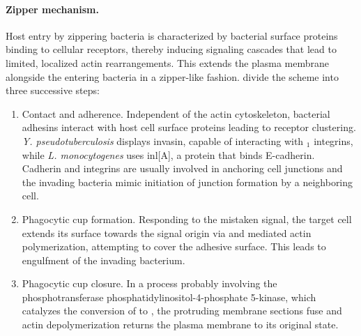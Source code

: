 \paragraph{Zipper mechanism.}
Host entry by zippering bacteria is characterized by bacterial surface proteins binding to cellular receptors, thereby inducing signaling cascades that lead to limited, localized actin rearrangements. This extends the plasma membrane alongside the entering bacteria in a zipper-like fashion. \citeauthor{Cossart2004} divide the scheme into three successive steps:
\begin{enumerate}[label=(\alph*)]
  \item Contact and adherence. Independent of the actin cytoskeleton, bacterial adhesins interact with host cell surface proteins leading to receptor clustering. \textit{Y. pseudotuberculosis} displays invasin, capable of interacting with \textbeta$_1$ integrins, while \textit{L. monocytogenes} uses \acrshort{inl}[A], a protein that binds E-cadherin. Cadherin and integrins are usually involved in anchoring cell junctions and the invading bacteria mimic initiation of junction formation by a neighboring cell.
  \item Phagocytic cup formation. Responding to the mistaken signal, the target cell extends its surface towards the signal origin via  and  mediated actin polymerization, attempting to cover the adhesive surface. This leads to engulfment of the invading bacterium. 
  \item Phagocytic cup closure. In a process probably involving the phosphotransferase phosphatidylinositol-4-phosphate 5-kinase, which catalyzes the conversion of  to , the protruding membrane sections fuse and actin depolymerization returns the plasma membrane to its original state.
\end{enumerate}

\label{trigger-mechanism}

